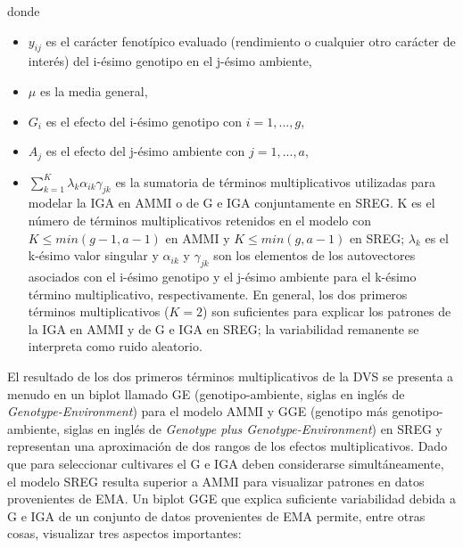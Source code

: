donde 
\begin{itemize}
\item $y_{ij}$ es el carácter fenotípico evaluado (rendimiento o cualquier otro carácter de interés) del i-ésimo genotipo en el j-ésimo ambiente,
\item $\mu$ es la media general,
\item  $G_i$ es el efecto del i-ésimo genotipo con $i=1,...,g$,
\item $A_j$ es el efecto del j-ésimo ambiente con $j=1,...,a$,
\item $\sum_{k=1}^K \lambda_k \alpha_{ik} \gamma_{jk}$ es la sumatoria de términos multiplicativos utilizadas para modelar la IGA en AMMI o de G e IGA conjuntamente en SREG. K es el número de términos multiplicativos retenidos en el modelo con $K \leq min(g-1,a-1)$ en AMMI y $K \leq min(g,a-1)$ en SREG; $\lambda_k$ es el k-ésimo valor singular y $\alpha_{ik}$ y $\gamma_{jk}$ son los elementos de los autovectores asociados con el i-ésimo genotipo y el j-ésimo ambiente para el k-ésimo término multiplicativo, respectivamente. En general, los dos primeros términos multiplicativos ($K=2$) son suficientes para explicar los patrones de la IGA en AMMI y de G e IGA en SREG; la variabilidad remanente se interpreta como ruido aleatorio. 
\end{itemize}


El resultado de los dos primeros términos multiplicativos de la DVS se presenta a menudo en un biplot llamado GE (genotipo-ambiente, siglas en inglés de \emph{Genotype-Environment}) para el modelo AMMI \citep{Zobel1988} y GGE (genotipo más genotipo-ambiente, siglas en inglés de \emph{Genotype plus Genotype-Environment}) en SREG \citep{Yanetal2000} y representan una aproximación de dos rangos de los efectos multiplicativos. Dado que para seleccionar cultivares el G e IGA deben considerarse simultáneamente, el modelo SREG resulta superior a AMMI para visualizar patrones en datos provenientes de EMA. Un biplot GGE que explica suficiente variabilidad debida a G e IGA de un conjunto de datos provenientes de EMA permite, entre otras cosas, visualizar tres aspectos importantes: 

